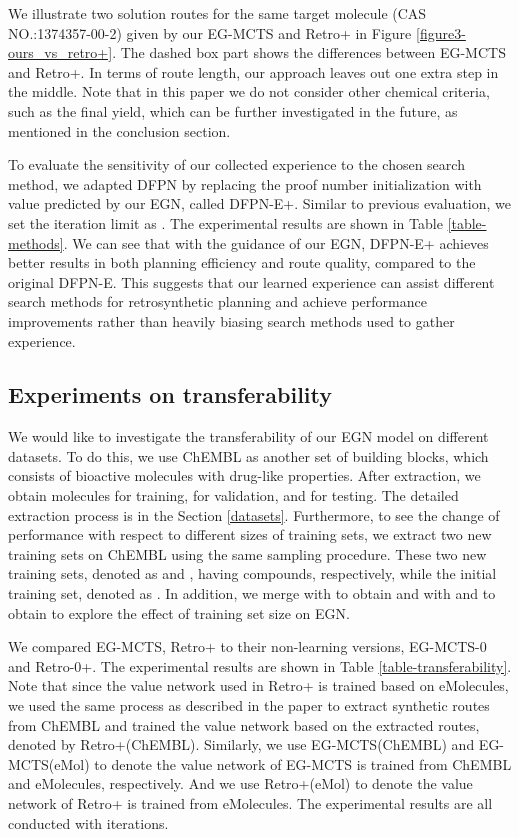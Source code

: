\documentclass[sn-mathphys,Numbered]{sn-jnl}
\begin{document}
We illustrate two solution routes for the same target molecule (CAS NO.:1374357-00-2) given by our EG-MCTS and Retro+ in Figure \ref{figure3-ours_vs_retro+}. The dashed box part shows the differences between EG-MCTS and Retro+. In terms of route length, our approach leaves out one extra step in the middle. Note that in this paper we do not consider other chemical criteria, such as the final yield, which can be further investigated in the future, as mentioned in the conclusion section.

To evaluate the sensitivity of our collected experience to the chosen search method, we adapted DFPN by replacing the proof number initialization with value  predicted by our EGN, called DFPN-E+. Similar to previous evaluation, we set the iteration limit as . The experimental results are shown in Table \ref{table-methods}. We can see that with the guidance of our EGN, DFPN-E+ achieves better results in both planning efficiency and route quality, compared to the original DFPN-E.
This suggests that our learned experience can assist different search methods for retrosynthetic planning and achieve performance improvements rather than heavily biasing search methods used to gather experience.

\subsection{Experiments on transferability}\label{chembl-exp}
We would like to investigate the transferability of our EGN model on different datasets. 
To do this, we use ChEMBL as another set of building blocks, which consists of  bioactive molecules with drug-like properties.
After extraction, we obtain  molecules for training,  for validation, and  for testing.
The detailed extraction process is in the Section \ref{datasets}. 
Furthermore, to see the change of performance with respect to different sizes of training sets, we extract two new training sets on ChEMBL using the same sampling procedure.
These two new training sets, denoted as  and , having  compounds, respectively, while the initial training set, denoted as .
In addition, we merge  with  to obtain  and  with  and  to obtain  to explore the effect of training set size on EGN.



We compared EG-MCTS, Retro+ to their non-learning versions, EG-MCTS-0 and Retro-0+. The experimental results are shown in Table \ref{table-transferability}.
Note that since the value network used in Retro+ is trained based on eMolecules, we used the same process as described in the paper \cite{retro2020} to extract synthetic routes from ChEMBL and trained the value network based on the extracted routes, denoted by Retro+(ChEMBL). Similarly, we use EG-MCTS(ChEMBL) and EG-MCTS(eMol) to denote the value network of EG-MCTS is trained from ChEMBL and eMolecules, respectively. And we use Retro+(eMol) to denote the value network of Retro+ is trained from eMolecules. The experimental results are all conducted with  iterations.
\end{document}
